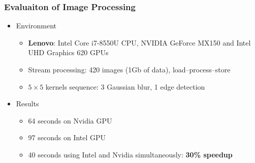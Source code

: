 \documentclass[xcolor=table,aspectratio=169]{beamer}
\begin{document}
\begin{frame}[fragile]
  \frametitle{Evaluaiton of Image Processing}

\begin{itemize}
  \item Environment
  \begin{itemize}
    \item \textbf{Lenovo}: Intel Core i7-8550U CPU, NVIDIA GeForce MX150 and Intel UHD Graphics 620 GPUs
    \item Stream processing: 420 images (1Gb of data), load--process--store
    \item $5 \times 5$ kernels sequence: 3 Gaussian blur, 1 edge detection
  \end{itemize}
  \item Results
  \begin{itemize}
    \item 64 seconds on Nvidia GPU
    \item 97 seconds on Intel GPU
    \item 40 seconds using Intel and Nvidia simultaneously: \textbf{30\% speedup} 
  \end{itemize}
\end{itemize}  
\end{frame}
\end{document}

